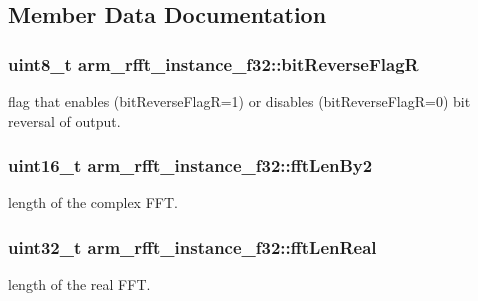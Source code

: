 \subsection{Member Data Documentation}
\subsubsection[{\texorpdfstring{bit\+Reverse\+FlagR}{bitReverseFlagR}}]{\setlength{\rightskip}{0pt plus 5cm}uint8\+\_\+t arm\+\_\+rfft\+\_\+instance\+\_\+f32\+::bit\+Reverse\+FlagR}\hypertarget{structarm__rfft__instance__f32_ac342f3248157cbbd2f04a3c8ec9fc9eb}{}\label{structarm__rfft__instance__f32_ac342f3248157cbbd2f04a3c8ec9fc9eb}
flag that enables (bit\+Reverse\+FlagR=1) or disables (bit\+Reverse\+FlagR=0) bit reversal of output. 
\subsubsection[{\texorpdfstring{fft\+Len\+By2}{fftLenBy2}}]{\setlength{\rightskip}{0pt plus 5cm}uint16\+\_\+t arm\+\_\+rfft\+\_\+instance\+\_\+f32\+::fft\+Len\+By2}\hypertarget{structarm__rfft__instance__f32_a075076e07ebb8521d8e3b49a31db6c57}{}\label{structarm__rfft__instance__f32_a075076e07ebb8521d8e3b49a31db6c57}
length of the complex F\+FT. 
\subsubsection[{\texorpdfstring{fft\+Len\+Real}{fftLenReal}}]{\setlength{\rightskip}{0pt plus 5cm}uint32\+\_\+t arm\+\_\+rfft\+\_\+instance\+\_\+f32\+::fft\+Len\+Real}\hypertarget{structarm__rfft__instance__f32_a4219d4669699e4efdcb150ed7a0d9a57}{}\label{structarm__rfft__instance__f32_a4219d4669699e4efdcb150ed7a0d9a57}
length of the real F\+FT. 
